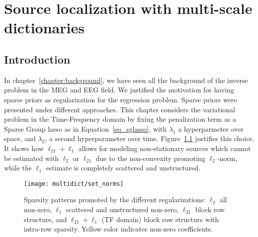 
\chapter{Source localization with multi-scale dictionaries} %

\label{chapter:multiscale} %
\noindent\makebox[\linewidth]{\rule{0.75\paperwidth}{0.4pt}}
\noindent\makebox[\linewidth]{\rule{0.75\paperwidth}{0.4pt}}

\localtableofcontents %

\noindent\makebox[\linewidth]{\rule{0.75\paperwidth}{0.4pt}}
\noindent\makebox[\linewidth]{\rule{0.75\paperwidth}{0.4pt}}
\newpage

\section{Introduction}
In chapter~\ref{chapter:background}, we have seen all the background of the inverse problem in the MEG and EEG field. We justified the motivation for having sparse priors as regularization for the regression problem. Sparse priors were presented under different approaches. This chapter considers the variational problem in the Time-Frequency domain by fixing the penalization term as a Sparse Group \ac{lasso} as in Equation~\eqref{eq_sglasso}, with $\lambda_1$ a hyperparmeter over space, and $\lambda_2$, a second hyperparameter over time. Figure~\ref{fig:set_norms} justifies this choice. It shows how $\ell_{21}+\ell_1$ allows for modeling non-stationary sources which cannot be estimated with $\ell_2$ or $\ell_{21}$ due to the non-convexity promoting $\ell_2$-norm, while the $\ell_1$ estimate is completely scattered and unstructured.\\

\begin{figure}
\centering
	\texttt{[image: multidict/set\_norms]}
    \caption{Sparsity patterns promoted by the different regularizations: $\ell_2$ all non-zero, $\ell_1$ scattered and unstructured non-zero, $\ell_{21}$ block row structure, and $\ell_{21} + \ell_1$ (TF domain) block row structure with intra-row sparsity. Yellow color indicates non-zero coefficients.}
    \label{fig:set_norms}
\end{figure}

